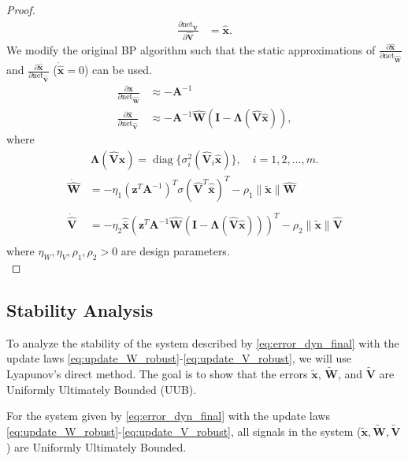 \documentclass[10pt,twocolumn]{ICCAS}
\newcommand{\xtilde}{\tilde{\bm{x}}}
\newcommand{\xhatbar}{\hat{\bar{\bm{x}}}}
\newcommand{\Wtilde}{\tilde{\mathbf{W}}}
\newcommand{\What}{\hat{\mathbf{W}}}
\newcommand{\Vtilde}{\tilde{\mathbf{V}}}
\newcommand{\Vhat}{\hat{\mathbf{V}}}
\newcommand{\diag}{\operatorname{diag}}
\begin{document}
\begin{proof}
\begin{align}
    \frac{\partial \text{net}_{\hat{\mathbf{V}}}}{\partial \hat{\mathbf{V}}} &= \hat{\bm{x}}.
\end{align}
We modify the original BP algorithm such that the static approximations of $\frac{\partial \hat{\bm{x}}}{\partial \text{net}_{\hat{\mathbf{W}}}}$ and $\frac{\partial \hat{\bm{x}}}{\partial \text{net}_{\hat{\mathbf{V}}}}$ ($\dot{\hat{\bm{x}}} = 0$) can be used.
\begin{align}
    \frac{\partial \hat{\bm{x}}}{\partial \text{net}_{\hat{\mathbf{W}}}} &\approx -\mathbf{A}^{-1} \nonumber \\
    \frac{\partial \hat{\bm{x}}}{\partial \text{net}_{\hat{\mathbf{V}}}} &\approx -\mathbf{A}^{-1}\hat{\mathbf{W}}(\mathbf{I} - \mathbf{\Lambda}(\hat{\mathbf{V}}\hat{\bm{x}})), 
\end{align}
where
\begin{align}
    \mathbf{\Lambda}(\hat{\mathbf{V}}\hat{\bm{x}}) = \diag\{\sigma_i^2(\hat{\mathbf{V}}_i\hat{\bm{x}})\}, \quad i=1,2,\dots,m.
\end{align}
\begin{align}
    \dot{\What} &= -\eta_1 \left(\bm{z}^{T} \bm{A}^{-1}  \right)^{T} \sigma(\Vhat^T\xhatbar)^T - \rho_1 \|\xtilde\| \What\\\label{eq:update_W_robust}\\
    \dot{\Vhat} &= -\eta_2 \xhatbar \left( \bm{z}^T \bm{A}^{-1} \What (\mathbf{I} - \mathbf{\Lambda}({\mathbf{\hat{V}}}{\bm{\hat{x}}})) \right)^T - \rho_2 \|\xtilde\| \Vhat \\\label{eq:update_V_robust}
\end{align}
where $\eta_W, \eta_V, \rho_1, \rho_2 > 0$ are design parameters.\\ 
\end{proof}

\subsection{Stability Analysis}

To analyze the stability of the system described by \eqref{eq:error_dyn_final} with the update laws \eqref{eq:update_W_robust}-\eqref{eq:update_V_robust}, we will use Lyapunov's direct method. The goal is to show that the errors $\xtilde$, $\Wtilde$, and $\Vtilde$ are Uniformly Ultimately Bounded (UUB).

\begin{theorem}
For the system given by \eqref{eq:error_dyn_final} with the update laws \eqref{eq:update_W_robust}-\eqref{eq:update_V_robust}, all signals in the system ($\xtilde, \Wtilde, \Vtilde$) are Uniformly Ultimately Bounded.
\end{theorem}
\end{document}
